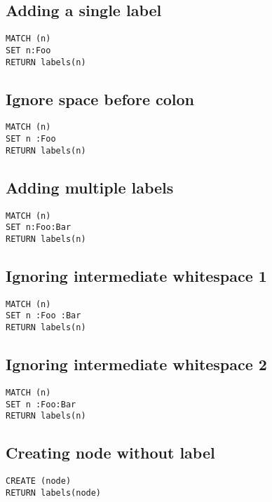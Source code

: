 \subsection{Adding a single label}

\begin{lstlisting}
MATCH (n)
SET n:Foo
RETURN labels(n)
\end{lstlisting}

\subsection{Ignore space before colon}

\begin{lstlisting}
MATCH (n)
SET n :Foo
RETURN labels(n)
\end{lstlisting}

\subsection{Adding multiple labels}

\begin{lstlisting}
MATCH (n)
SET n:Foo:Bar
RETURN labels(n)
\end{lstlisting}

\subsection{Ignoring intermediate whitespace 1}

\begin{lstlisting}
MATCH (n)
SET n :Foo :Bar
RETURN labels(n)
\end{lstlisting}

\subsection{Ignoring intermediate whitespace 2}

\begin{lstlisting}
MATCH (n)
SET n :Foo:Bar
RETURN labels(n)
\end{lstlisting}

\subsection{Creating node without label}

\begin{lstlisting}
CREATE (node)
RETURN labels(node)
\end{lstlisting}

